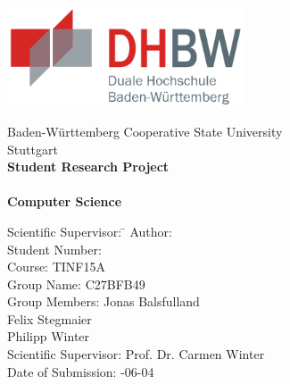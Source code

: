 \begin{titlepage}

\begin{minipage}{\textwidth}
		\vspace{-2cm}
		\centering \includegraphics[width=7cm, keepaspectratio]{img/dhbw_logo.png}
		\vspace{1cm}
\end{minipage}

\vspace{1em}

\sffamily
\begin{center}
	\textsf{\large{}Baden-Württemberg Cooperative State University\\[1.5mm] Stuttgart}\\[2em] 
	\vspace{1cm}
	\textsf{\textbf{\Large{}Student Research Project}}\\ 
	\vspace{1cm}
	\textsf{\textbf{\dertitel}} \\[2em]	
	\vspace{1cm}
	\textsf{\textbf{\Large{}Computer Science}}\\
	\vspace{2cm}
\vfill

\begin{minipage}{\textwidth}

\begin{tabbing}
	Scientific Supervisor: \hspace{1.85cm}\=\kill
	Author: \> \derautor \\[1.5mm]
	Student Number: \\[1.5mm]
	Course: \> TINF15A\\[1.5mm]
	Group Name: \> C27BFB49\\[1.5mm]
	Group Members: \> Jonas Balsfulland\\
	\> Felix Stegmaier\\
	\> Philipp Winter\\[1.5mm]
	Scientific Supervisor: \> Prof. Dr. Carmen Winter \\[1.5mm]
	Date of Submission: -06-04\\
\end{tabbing}
\end{minipage}

\end{center}

\end{titlepage}
